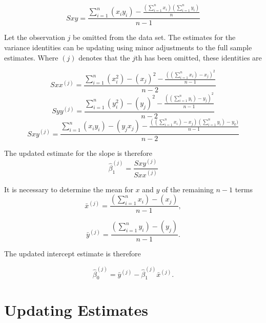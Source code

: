 \begin{equation}
Sxy=\frac{\sum_{i=1}^{n}(x_{i}y_{i})-\frac{(\sum_{i=1}^{n}x_{i})(\sum_{i=1}^{n}y_{i})}{n}}{n-1}
\end{equation}

Let the observation $j$ be omitted from the data set. The estimates for the variance identities can be updating using minor adjustments to the full sample estimates. Where $(j)$ denotes that the $j$th has been omitted, these identities are

\begin{equation}
Sxx^{(j)}=\frac{\sum_{i=1}^{n}(x_{i}^{2})-(x_{j})^{2}-\frac{((\sum_{i=1}^{n}x_{i})-x_{j})^{2}}{n-1}}{n-2}
\end{equation}
\begin{equation}
Syy^{(j)}=\frac{\sum_{i=1}^{n}(y_{i}^{2})-(y_{j})^{2}-\frac{((\sum_{i=1}^{n}y_{i})-y_{j})^{2}}{n-1}}{n-2}
\end{equation}
\begin{equation}
Sxy^{(j)}=\frac{\sum_{i=1}^{n}(x_{i}y_{i})-(y_{j}x_{j})-\frac{((\sum_{i=1}^{n}x_{i})-x_{j})(\sum_{i=1}^{n}y_{i})-y_{k})}{n-1}}{n-2}
\end{equation}

The updated estimate for the slope is therefore
\begin{equation}
\hat{\beta}_{1}^{(j)}=\frac{Sxy^{(j)}}{Sxx^{(j)}}
\end{equation}

It is necessary to determine the mean for $x$ and $y$ of the
remaining $n-1$ terms
\begin{equation}
\bar{x}^{(j)}=\frac{(\sum_{i=1}^{n}x_{i})-(x_{j})}{n-1},
\end{equation}

\begin{equation}
\bar{y}^{(j)}=\frac{(\sum_{i=1}^{n}y_{i})-(y_{j})}{n-1}.
\end{equation}

The updated intercept estimate is therefore

\begin{equation}
\hat{\beta}_{0}^{(j)}=\bar{y}^{(j)}-\hat{\beta}_{1}^{(j)}\bar{x}^{(j)}.
\end{equation}

\newpage
\section{Updating Estimates} %

